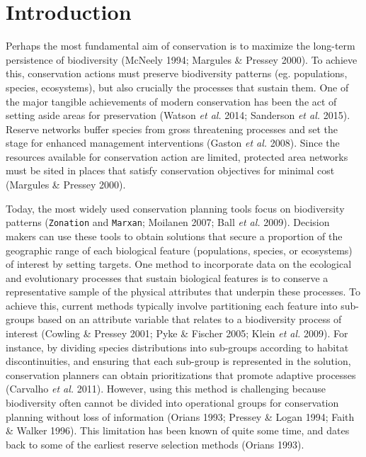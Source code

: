 \section{Introduction}\label{introduction}

Perhaps the most fundamental aim of conservation is to maximize the
long-term persistence of biodiversity (McNeely 1994; Margules \& Pressey
2000). To achieve this, conservation actions must preserve biodiversity
patterns (eg. populations, species, ecosystems), but also crucially the
processes that sustain them. One of the major tangible achievements of
modern conservation has been the act of setting aside areas for
preservation (Watson \emph{et al.} 2014; Sanderson \emph{et al.} 2015).
Reserve networks buffer species from gross threatening processes and set
the stage for enhanced management interventions (Gaston \emph{et al.}
2008). Since the resources available for conservation action are
limited, protected area networks must be sited in places that satisfy
conservation objectives for minimal cost (Margules \& Pressey 2000).

Today, the most widely used conservation planning tools focus on
biodiversity patterns (\texttt{Zonation} and \texttt{Marxan}; Moilanen
2007; Ball \emph{et al.} 2009). Decision makers can use these tools to
obtain solutions that secure a proportion of the geographic range of
each biological feature (populations, species, or ecosystems) of
interest by setting targets. One method to incorporate data on the
ecological and evolutionary processes that sustain biological features
is to conserve a representative sample of the physical attributes that
underpin these processes. To achieve this, current methods typically
involve partitioning each feature into sub-groups based on an attribute
variable that relates to a biodiversity process of interest (Cowling \&
Pressey 2001; Pyke \& Fischer 2005; Klein \emph{et al.} 2009). For
instance, by dividing species distributions into sub-groups according to
habitat discontinuities, and ensuring that each sub-group is represented
in the solution, conservation planners can obtain prioritizations that
promote adaptive processes (Carvalho \emph{et al.} 2011). However, using
this method is challenging because biodiversity often cannot be divided
into operational groups for conservation planning without loss of
information (Orians 1993; Pressey \& Logan 1994; Faith \& Walker 1996).
This limitation has been known of quite some time, and dates back to
some of the earliest reserve selection methods (Orians 1993).

